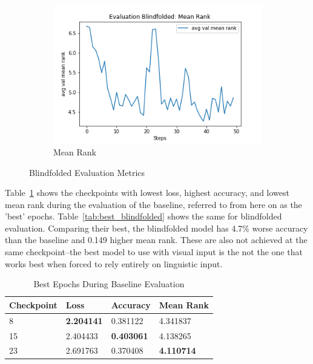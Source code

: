 \begin{figure}[h]
\begin{subfigure}[b]{0.3\textwidth}
         \includegraphics[width=\textwidth]{./figure/results/baseline_and_blindfolding/blindfolded/avg val mean rank.png}
         \caption{Mean Rank}
         \label{fig:blindfolded_mean_rank}
     \end{subfigure}
     \caption{Blindfolded Evaluation Metrics}
     \label{fig:blindfolded_metrics}
\end{figure}


Table~\ref{tab:best_baseline} shows the checkpoints with lowest loss, highest accuracy, and lowest mean rank during the evaluation of the baseline, referred to from here on as the 'best' epochs. Table~\ref{tab:best_blindfolded} shows the same for blindfolded evaluation. Comparing their best, the blindfolded model has 4.7\% worse accuracy than the baseline and 0.149 higher mean rank. These are also not achieved at the same checkpoint--the best model to use with visual input is the not the one that works best when forced to rely entirely on linguistic input. \newline %
\begin{table}[h]
\centering
\caption{Best Epochs During Baseline Evaluation}
\begin{tabular}{l | l | l | l}
Checkpoint & Loss & Accuracy & Mean Rank \\
\hline
8 & \textbf{2.204141} & 0.381122 & 4.341837 \\
15 & 2.404433 & \textbf{0.403061} & 4.138265 \\
23 & 2.691763 & 0.370408 & \textbf{4.110714}
\end{tabular}
\label{tab:best_baseline}
\end{table}

